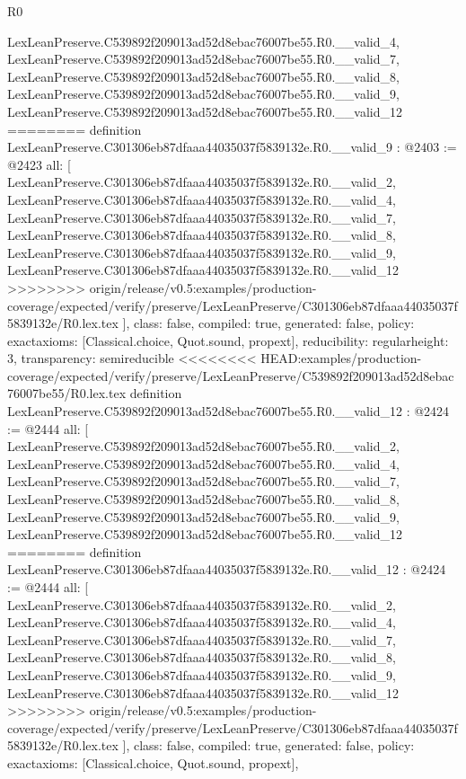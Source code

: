 \begin{lexlean}{R0}
\begin{coremodule}
{{{{{{{{{{{{{{{{{{{{{{{{{{{{{{{{{{{{{{{{{{{{{{{{    LexLeanPreserve.C539892f209013ad52d8ebac76007be55.R0.__valid_4,
    LexLeanPreserve.C539892f209013ad52d8ebac76007be55.R0.__valid_7,
    LexLeanPreserve.C539892f209013ad52d8ebac76007be55.R0.__valid_8,
    LexLeanPreserve.C539892f209013ad52d8ebac76007be55.R0.__valid_9,
    LexLeanPreserve.C539892f209013ad52d8ebac76007be55.R0.__valid_12
========
definition LexLeanPreserve.C301306eb87dfaaa44035037f5839132e.R0.__valid_9 : @2403 := @2423 {
  all: [
    LexLeanPreserve.C301306eb87dfaaa44035037f5839132e.R0.__valid_2,
    LexLeanPreserve.C301306eb87dfaaa44035037f5839132e.R0.__valid_4,
    LexLeanPreserve.C301306eb87dfaaa44035037f5839132e.R0.__valid_7,
    LexLeanPreserve.C301306eb87dfaaa44035037f5839132e.R0.__valid_8,
    LexLeanPreserve.C301306eb87dfaaa44035037f5839132e.R0.__valid_9,
    LexLeanPreserve.C301306eb87dfaaa44035037f5839132e.R0.__valid_12
>>>>>>>> origin/release/v0.5:examples/production-coverage/expected/verify/preserve/LexLeanPreserve/C301306eb87dfaaa44035037f5839132e/R0.lex.tex
  ],
  class: false,
  compiled: true,
  generated: false,
  policy: exact{axioms: [Classical.choice, Quot.sound, propext]},
  reducibility: regular{height: 3},
  transparency: semireducible
}
<<<<<<<< HEAD:examples/production-coverage/expected/verify/preserve/LexLeanPreserve/C539892f209013ad52d8ebac76007be55/R0.lex.tex
definition LexLeanPreserve.C539892f209013ad52d8ebac76007be55.R0.__valid_12 : @2424 := @2444 {
  all: [
    LexLeanPreserve.C539892f209013ad52d8ebac76007be55.R0.__valid_2,
    LexLeanPreserve.C539892f209013ad52d8ebac76007be55.R0.__valid_4,
    LexLeanPreserve.C539892f209013ad52d8ebac76007be55.R0.__valid_7,
    LexLeanPreserve.C539892f209013ad52d8ebac76007be55.R0.__valid_8,
    LexLeanPreserve.C539892f209013ad52d8ebac76007be55.R0.__valid_9,
    LexLeanPreserve.C539892f209013ad52d8ebac76007be55.R0.__valid_12
========
definition LexLeanPreserve.C301306eb87dfaaa44035037f5839132e.R0.__valid_12 : @2424 := @2444 {
  all: [
    LexLeanPreserve.C301306eb87dfaaa44035037f5839132e.R0.__valid_2,
    LexLeanPreserve.C301306eb87dfaaa44035037f5839132e.R0.__valid_4,
    LexLeanPreserve.C301306eb87dfaaa44035037f5839132e.R0.__valid_7,
    LexLeanPreserve.C301306eb87dfaaa44035037f5839132e.R0.__valid_8,
    LexLeanPreserve.C301306eb87dfaaa44035037f5839132e.R0.__valid_9,
    LexLeanPreserve.C301306eb87dfaaa44035037f5839132e.R0.__valid_12
>>>>>>>> origin/release/v0.5:examples/production-coverage/expected/verify/preserve/LexLeanPreserve/C301306eb87dfaaa44035037f5839132e/R0.lex.tex
  ],
  class: false,
  compiled: true,
  generated: false,
  policy: exact{axioms: [Classical.choice, Quot.sound, propext]},
}}}}}}}}}}}}}}}}}}}}}}}}}}}}}}}}}}}}}}}}}}}}}}}}}}
\end{coremodule}
\end{lexlean}
